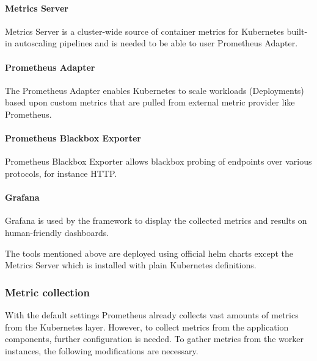 \paragraph{Metrics Server} Metrics Server is a cluster-wide source of container metrics for Kubernetes built-in autoscaling pipelines and is needed to be able to user Prometheus Adapter.

\paragraph{Prometheus Adapter} The Prometheus Adapter enables Kubernetes to scale workloads (\eg Deployments) based upon custom metrics that are pulled from external metric provider like Prometheus.

\paragraph{Prometheus Blackbox Exporter} Prometheus Blackbox Exporter allows blackbox probing of endpoints over various protocols, for instance HTTP.

\paragraph{Grafana} Grafana is used by the framework to display the collected metrics and results on human-friendly dashboards.

The tools mentioned above are deployed using official helm charts \cite{PrometheusChart} \cite{PrometheusAdapterChart} \cite{BlackboxExporterChart} \cite{GrafanaChart} except the Metrics Server which is installed with plain Kubernetes definitions. 

\subsubsection{Metric collection}


With the default settings Prometheus already collects vast amounts of metrics from the Kubernetes layer. However, to collect metrics from the application components, further configuration is needed. To gather metrics from the worker instances, the following modifications are necessary.

